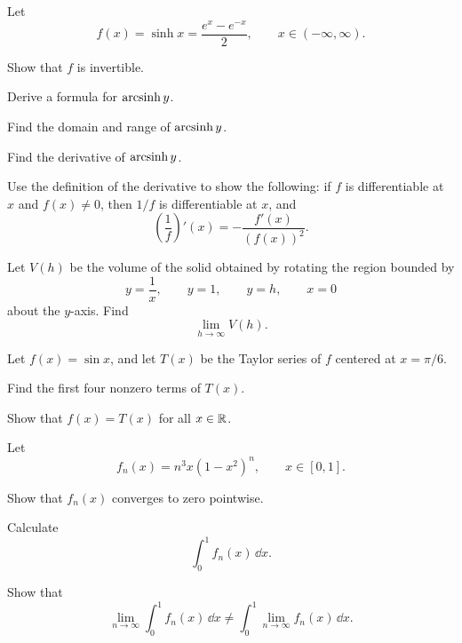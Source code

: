 \begin{problem}
Let
\[
f(x)=\sinh x=\frac{e^x-e^{-x}}{2},
\qquad x\in(-\infty, \infty).
\]
\begin{problemsubparts}
\item Show that $f$ is invertible.
\item Derive a formula for $\operatorname{arcsinh} y$.
\item Find the domain and range of $\operatorname{arcsinh} y$.
\item Find the derivative of $\operatorname{arcsinh} y$.
\end{problemsubparts}
\end{problem}

\begin{problem}
Use the definition of the derivative to show the following: if $f$ is differentiable at $x$ and $f(x)\ne0$, then $1/f$ is differentiable at $x$, and
\[
\left(\frac1f\right)'(x)
=-\frac{f'(x)}{(f(x))^2}.
\]
\end{problem}

\begin{problem}
Let $V(h)$ be the volume of the solid obtained by rotating the region bounded by
\[
y=\frac{1}{x},
\qquad y=1,
\qquad y=h,
\qquad x=0
\]
about the $y$-axis. Find
\[
\lim_{h\to\infty}V(h).
\]
\end{problem}

\begin{problem}
Let $f(x)=\sin x$, and let $T(x)$ be the Taylor series of $f$ centered at $x=\pi/6$.
\begin{problemsubparts}
\item Find the first four nonzero terms of $T(x)$.
\item Show that $f(x)=T(x)$ for all $x\in\mathbb{R}$.
\end{problemsubparts}
\end{problem}

\begin{problem}
Let
\[
f_n(x)=n^3x(1-x^2)^n,
\qquad x\in[0, 1].
\]
\begin{problemsubparts}
\item Show that $f_n(x)$ converges to zero pointwise.
\item Calculate
\[
\int_0^1 f_n(x)\,\dd x.
\]
\item Show that
\[
\lim_{n\to\infty}\int_0^1 f_n(x)\,\dd x
\ne
\int_0^1\lim_{n\to\infty}f_n(x)\,\dd x.
\]
\end{problemsubparts}
\end{problem}

